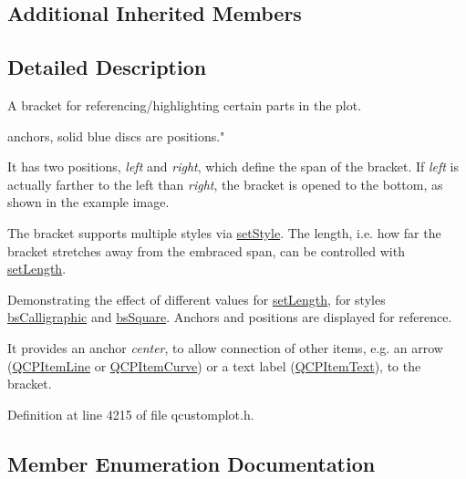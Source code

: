 \subsection*{Additional Inherited Members}


\subsection{Detailed Description}
A bracket for referencing/highlighting certain parts in the plot. 

 anchors, solid blue discs are positions."

It has two positions, {\itshape left} and {\itshape right}, which define the span of the bracket. If {\itshape left} is actually farther to the left than {\itshape right}, the bracket is opened to the bottom, as shown in the example image.

The bracket supports multiple styles via \hyperlink{class_q_c_p_item_bracket_a612dffa2373422eef8754d690add3703}{set\+Style}. The length, i.\+e. how far the bracket stretches away from the embraced span, can be controlled with \hyperlink{class_q_c_p_item_bracket_ac7cfc3da7da9b5c5ac5dfbe4f0351b2a}{set\+Length}.

 \begin{center}Demonstrating the effect of different values for \hyperlink{class_q_c_p_item_bracket_ac7cfc3da7da9b5c5ac5dfbe4f0351b2a}{set\+Length}, for styles \hyperlink{class_q_c_p_item_bracket_a7ac3afd0b24a607054e7212047d59dbda8f29f5ef754e2dc9a9efdedb2face0f3}{bs\+Calligraphic} and \hyperlink{class_q_c_p_item_bracket_a7ac3afd0b24a607054e7212047d59dbda7f9df4a7359bfe3dac1dbe4ccf5d220c}{bs\+Square}. Anchors and positions are displayed for reference.\end{center} 

It provides an anchor {\itshape center}, to allow connection of other items, e.\+g. an arrow (\hyperlink{class_q_c_p_item_line}{Q\+C\+P\+Item\+Line} or \hyperlink{class_q_c_p_item_curve}{Q\+C\+P\+Item\+Curve}) or a text label (\hyperlink{class_q_c_p_item_text}{Q\+C\+P\+Item\+Text}), to the bracket. 

Definition at line 4215 of file qcustomplot.\+h.



\subsection{Member Enumeration Documentation}
\hypertarget{class_q_c_p_item_bracket_a7f3a6a56d67f71219ed220553f3dd861}{}
